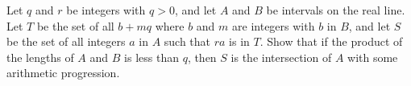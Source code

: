 Let $q$ and $r$ be integers with $q > 0$, and let $A$ and $B$ be intervals on the real line.
Let $T$ be the set of all $b+mq$ where $b$ and $m$ are integers with $b$ in $B$,
and let $S$ be the set of all integers $a$ in $A$ such that $ra$ is in $T$. Show that if the
product of the lengths of $A$ and $B$ is less than $q$, then $S$ is the intersection of $A$
with some arithmetic progression.
